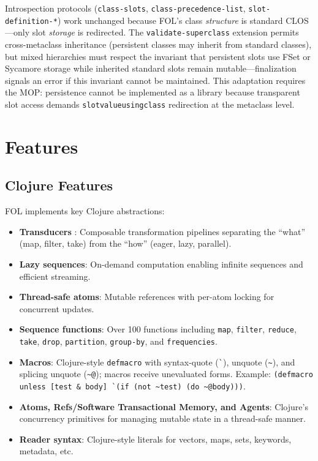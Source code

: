 \documentclass[sigconf,nonacm,review]{acmart}
\begin{document}
Introspection protocols (\texttt{class-slots}, \texttt{class-precedence-list}, \texttt{slot-definition-*}) work unchanged because FOL's class \textit{structure} is standard CLOS---only slot
\textit{storage} is redirected. The \texttt{validate-superclass} extension permits cross-metaclass inheritance (persistent classes may inherit from standard classes), but mixed hierarchies
must respect the invariant that persistent slots use FSet or Sycamore storage while inherited standard slots remain mutable---finalization signals an error if this invariant cannot be maintained.
This adaptation requires the MOP: persistence cannot be implemented as a library because transparent slot access demands \texttt{slot\discretionary{-}{}{-}value\discretionary{-}{}{-}using\discretionary{-}{}{-}class}
redirection at the metaclass level.

\section{Features}

\subsection{Clojure Features}

FOL implements key Clojure abstractions:

\begin{itemize}
\item \textbf{Transducers} \cite{Hickey2014}: Composable transformation pipelines separating the ``what'' (map, filter, take) from the ``how'' (eager, lazy, parallel).
\item \textbf{Lazy sequences}: On-demand computation enabling infinite sequences and efficient streaming.
\item \textbf{Thread-safe atoms}: Mutable references with per-atom locking for concurrent updates.
\item \textbf{Sequence functions}: Over 100 functions including \texttt{map}, \texttt{filter}, \texttt{reduce}, \texttt{take}, \texttt{drop}, \texttt{partition}, \texttt{group-by}, and \texttt{frequencies}.
\item \textbf{Macros}: Clojure-style \texttt{defmacro} with syntax-quote (\texttt{\`{}}), unquote (\texttt{\~{}}), and splicing unquote (\texttt{\~{}@}); macros receive unevaluated forms.
Example: \texttt{(defmacro unless [test \& body] \`{}(if (not \~{}test) (do \~{}@body)))}.
\item \textbf{Atoms, Refs/Software Transactional Memory, and Agents}: Clojure's concurrency primitives for managing mutable state in a thread-safe manner.
\item \textbf{Reader syntax}: Clojure-style literals for vectors, maps, sets, keywords, metadata, etc.
\end{itemize}
\end{document}
